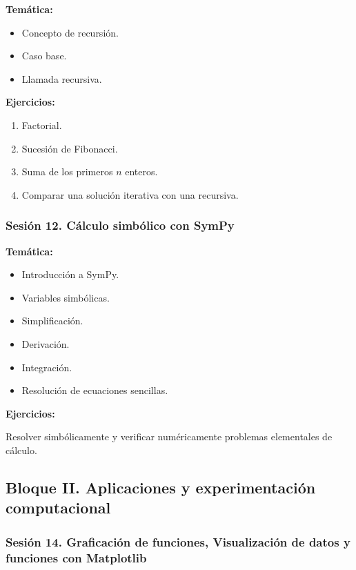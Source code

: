 \documentclass[12pt,letterpaper]{article}
\begin{document}
\textbf{Temática:}
\begin{itemize}[noitemsep]
    \item Concepto de recursión.
    \item Caso base.
    \item Llamada recursiva.
\end{itemize}

\textbf{Ejercicios:}
\begin{enumerate}[noitemsep]
    \item Factorial.
    \item Sucesión de Fibonacci.
    \item Suma de los primeros $n$ enteros.
    \item Comparar una solución iterativa con una recursiva.
\end{enumerate}

\subsubsection*{Sesión 12. Cálculo simbólico con SymPy}

\textbf{Temática:}
\begin{itemize}[noitemsep]
    \item Introducción a SymPy.
    \item Variables simbólicas.
    \item Simplificación.
    \item Derivación.
    \item Integración.
    \item Resolución de ecuaciones sencillas.
\end{itemize}



\textbf{Ejercicios:}

Resolver simbólicamente y verificar numéricamente problemas elementales de cálculo.


\subsection{Bloque II. Aplicaciones y experimentación computacional}

\subsubsection*{Sesión 14. Graficación de funciones, Visualización de datos y funciones con Matplotlib}
\end{document}
